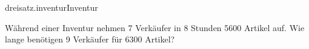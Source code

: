 \begin{exercise}{dreisatz.inventur}{Inventur}
  \ifproblem\problem\par
    Während einer Inventur nehmen 7 Verkäufer in 8 Stunden \num{5600} Artikel auf.
    Wie lange benötigen 9 Verkäufer für \num{6300} Artikel?
  \fi
\end{exercise}
